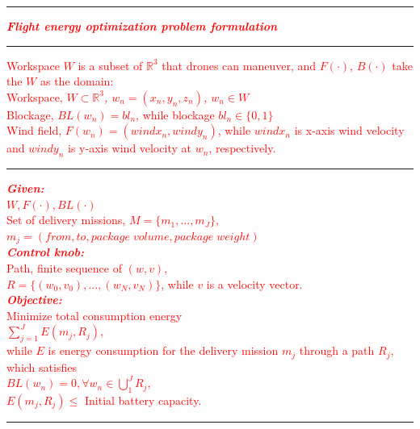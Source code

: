 \documentclass[onecolumn]{IEEEconf}
\begin{document}
\begin{description}
\begin{mdframed}[ linewidth=.75pt, userdefinedwidth=0.9\textwidth]
    \textcolor{red}{
    \vspace{7pt}
    \hrule
    \vspace{5pt}
    \noindent\textit{\textbf{Flight energy optimization problem formulation}}
    \vspace{5pt}
    \hrule
    \vspace{5pt}
    \noindent Workspace $W$ is a subset of $\mathbb{R}^3$ that drones can maneuver, and $F(\cdot)$, $B(\cdot)$ take the $W$ as the domain:\\
    \indent Workspace, \textit{$W\subset\mathbb{R}^3$, $w_n=(x_n,y_n,z_n)$, $w_n \in W$ }\\
    \indent Blockage, \textit{$BL(w_n)=bl_n$}, while blockage $bl_n\in\{0,1\}$\\
    \indent Wind field, \textit{$F(w_n) = (windx_n, windy_n)$}, while $windx_n$ is  
     x-axis wind velocity and $windy_n$ is y-axis wind velocity
     at $w_n$, respectively.
    \vspace{5pt}
    \hrule
    \vspace{5pt}
    \noindent\textit{\textbf{Given:}}~\\
    \indent $W, F(\cdot), BL(\cdot)$~\\
    \indent Set of delivery missions, $M = \{m_1, ..., m_J\},$~\\ 
    \indent $m_j = (from, to, package\;volume, package\;weight)$~\\
    \noindent\textit{\textbf{Control knob:}}~\\
    \indent Path, finite sequence of $(w,v)$,~\\
    \indent $R = \{(w_0,v_0), ..., (w_N,v_N)\}$, while $v$ is a velocity vector.
   ~\\
    \noindent\textit{\textbf
    {Objective:}}~\\ 
    \indent Minimize total consumption energy~\\
    \indent\indent $\sum_{j=1}^J E(m_j,R_j)$,~\\
    \indent while $E$ is energy consumption for the delivery mission $m_j$ through a path $R_j$, which satisfies~\\
    \indent\indent $BL(w_n) = 0, \forall w_n \in \bigcup_{1}^J R_j,$~\\
    \indent\indent $E(m_j, R_j) \leq$ Initial battery capacity.
    \vspace{5pt}
    \hrule
    \vspace{5pt}
    }
    \vspace{5pt}
    

\end{mdframed}
\end{description}
\end{document}
